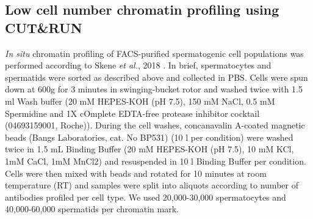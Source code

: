 \subsection{Low cell number chromatin profiling using CUT\&{}RUN}
\label{appA.2.CnR}

\emph{In situ} chromatin profiling of FACS-purified spermatogenic cell populations was performed according to Skene \emph{et al.}, 2018 \citep{Skene2018}. 
In brief, spermatocytes and spermatids were sorted as described above and collected in PBS. Cells were spun down at 600g for 3 minutes in swinging-bucket rotor and washed twice with 1.5 ml Wash buffer (20 mM HEPES-KOH (pH 7.5), 150 mM NaCl, 0.5 mM Spermidine and 1X cOmplete\texttrademark{} EDTA-free protease inhibitor cocktail (04693159001, Roche)). 
During the cell washes, concanavalin A-coated magnetic beads (Bangs Laboratories, cat. No BP531) (10 \textmu{}l per condition) were washed twice in 1.5 mL Binding Buffer (20 mM HEPES-KOH (pH 7.5), 10 mM KCl, 1mM CaCl, 1mM MnCl2) and resuspended in 10 \textmu{}l Binding Buffer per condition. 
Cells were then mixed with beads and rotated for 10 minutes at room temperature (RT) and samples were split into aliquots according to number of antibodies profiled per cell type. We used 20,000-30,000 spermatocytes and 40,000-60,000 spermatids per chromatin mark.\\ 

